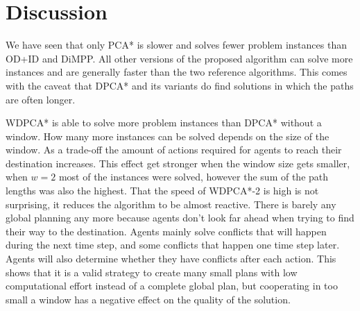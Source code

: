\section{Discussion}\label{sec:discussion}


We have seen that only PCA* is slower and solves fewer problem instances than
OD+ID and DiMPP. All other versions of the proposed algorithm can solve more
instances and are generally faster than the two reference algorithms. This
comes with the caveat that DPCA* and its variants do find solutions in which
the paths are often longer.

WDPCA* is able to solve more problem instances than DPCA* without a window. How
many more instances can be solved depends on the size of the window. As a
trade-off the amount of actions required for agents to reach their destination
increases. This effect get stronger when the window size gets smaller, when
$w=2$ most of the instances were solved, however the sum of the path lengths
was also the highest. That the speed of WDPCA*-2 is high is not surprising, it
reduces the algorithm to be almost reactive. There is barely any global
planning any more because agents don't look far ahead when trying to find their
way to the destination. Agents mainly solve conflicts that will
happen during the next time step, and some conflicts that happen one time step
later. Agents will also determine whether they have conflicts after each action.
This shows that it is a valid strategy to create many small plans with
low computational effort instead of a complete global plan, but cooperating in
too small a window has a negative effect on the quality of the solution.

